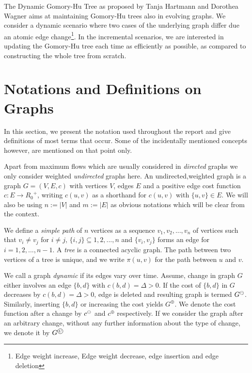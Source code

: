     \vspace{5mm}
    The Dynamic Gomory-Hu Tree as proposed by Tanja Hartmann and Dorothea Wagner aims at maintaining Gomory-Hu trees also in evolving graphs. We consider a dynamic scenario where two cases of the underlying graph differ due an atomic edge change\footnote[1]{Edge weight increase, Edge weight decrease, edge insertion and edge deletion}. In the incremental scenarios, we are interested in updating the Gomory-Hu tree each time as efficiently as possible, as compared to constructing the whole tree from scratch.  
    \enlargethispage{\baselineskip}

     \section{Notations and Definitions on Graphs}
     In this section, we present the notation used throughout the report and give definitions of most terms that occur. Some of the incidentally mentioned concepts however, are mentioned on that point only.

    \vspace{5mm}
     Apart from maximum flows which are usually considered in \textit{directed} graphs we only consider weighted \textit{undirected} graphs here. An undirected,weighted graph is a graph $G = (V,E,c)$ with vertices $V$, edges $E$ and a positive edge cost function $c:E\xrightarrow{}{R_0}^{+}$, writing $c(u,v)$ as a shorthand for $c({u,v})$ with $\{u,v\} \in E$. We will also be using $n:=|V|$ and $m:=|E|$ as obvious notations which will be clear from the context.

    \vspace{5mm}
     We define a \textit{simple path} of $n$ vertices as a sequence $v_1,v_2,...,v_n$ of vertices such that $v_i \ne v_j$ for $i \ne j$, $\{i,j\}\subseteq {1,2,...,n}$ and $\{v_i,v_j\}$ forms an edge for $i=1,2,...,n-1$. A \textit{tree} is a connected acyclic graph. The path between two vertices of a tree is unique, and we write $\pi (u,v)$ for the path between $u$ and $v$.

    \vspace{5mm}
     We call a graph \textit{dynamic} if its edges vary over time. Assume, change in graph $G$ either involves an edge $\{b,d\}$ with $c(b,d)= \Delta > 0$. If the cost of $\{b,d\}$ in $G$ decreases by $c(b,d) = \Delta > 0$, edge is deleted and resulting graph is termed $G^{\mathbin{\large\ominus}}$. Similarly, inserting $\{b,d\}$ or increasing the cost yields $G^\oplus$. We denote the cost function after a change by $c^{\mathbin{\large\ominus}}$ and $c^\oplus$ respectively. If we consider the graph after an arbitrary change, without any further information about the type of change, we denote it by $G^{\circledU}$ 
    
